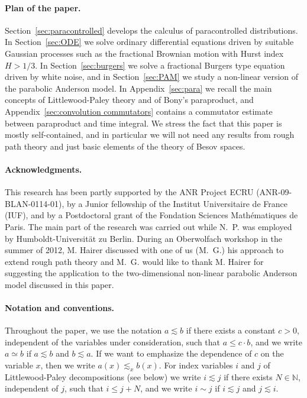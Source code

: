 \documentclass[11pt,a4paper]{article}
\theoremstyle{remark}
\begin{document}
\paragraph{Plan of the paper.}

Section~\ref{sec:paracontrolled} develops the calculus of paracontrolled distributions. In Section~\ref{sec:ODE} we solve ordinary differential equations driven by suitable Gaussian processes such as the fractional Brownian motion with Hurst index $H>1/3$. In Section~\ref{sec:burgers} we solve a fractional Burgers type equation driven by white noise, and in Section~\ref{sec:PAM} we study a non-linear version of the parabolic Anderson model. %
In Appendix~\ref{sec:para} we recall the main concepts of Littlewood-Paley theory and of Bony's paraproduct, and Appendix~\ref{sec:convolution commutators} contains a commutator estimate between paraproduct and time integral. We stress the fact that this paper is mostly self-contained, and in particular we will not need any results from rough path theory and just basic elements of the theory of Besov spaces.



\paragraph{Acknowledgments.} This research has been partly supported by the ANR Project
ECRU (ANR-09-BLAN-0114-01), by a Junior fellowship of the Institut Universitaire de France (IUF), and by a Postdoctoral grant of the Fondation Sciences Math\'ematiques de Paris. The main part of the research was carried out while N.~P. was employed by Humboldt-Universit\"at zu Berlin.
During an Oberwolfach workshop in the summer of 2012, M. Hairer discussed with one of us (M.~G.) his approach to extend rough
path theory and  M.~G. would like
to thank M. Hairer for suggesting the application to the two-dimensional non-linear
parabolic Anderson model discussed in this paper.



\paragraph{Notation and conventions.}%

Throughout the paper, we use the notation $a \lesssim b$ if there exists a constant $c>0$, independent of the variables under consideration, such that $a \leqslant c \cdot b$, and we write $a \simeq b$ if $a \lesssim b$ and $b \lesssim a$. If we want to emphasize the dependence of $c$ on the variable $x$, then we write $a(x) \lesssim_{x} b(x)$. For index variables $i$ and $j$ of Littlewood-Paley decompositions (see below) we write $i \lesssim j$ if there exists $N \in \mathbb{N}$, independent of $j$, such that $i \leqslant j +N$, and we write $i \sim j$ if $i \lesssim j$ and $j \lesssim i$.
\end{document}

